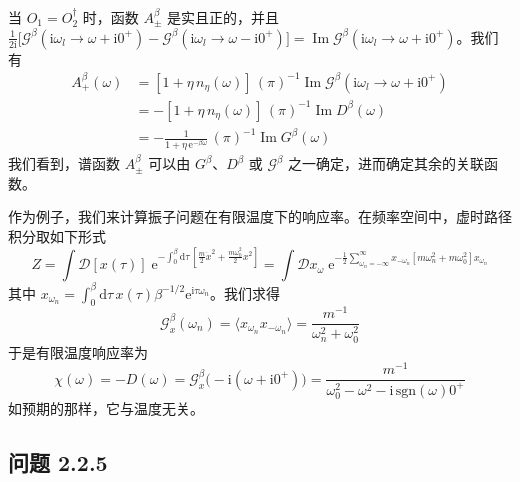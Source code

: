 当 $O_1 = O^{\dagger}_2$ 时，函数 $A^{\beta}_{\pm}$ 是实且正的，并且 $\frac{1}{2\mathrm{i}}\bigl[ \mathcal{G}^{\beta}(\mathrm{i}\omega_l \to \omega + \mathrm{i}0^{+}) - \mathcal{G}^{\beta}(\mathrm{i}\omega_l \to \omega - \mathrm{i}0^{+}) \bigr] = \operatorname{Im} \mathcal{G}^{\beta}(\mathrm{i}\omega_l \to \omega + \mathrm{i}0^{+})$。我们有
\begin{equation*}
\boxed{
\begin{aligned}
A^{\beta}_{+}(\omega) &= [1 + \eta\, n_{\eta}(\omega)]\,(\pi)^{-1} \operatorname{Im} \mathcal{G}^{\beta}(\mathrm{i}\omega_l \to \omega + \mathrm{i}0^{+})
\\
&= -[1 + \eta\, n_{\eta}(\omega)]\,(\pi)^{-1} \operatorname{Im} D^{\beta}(\omega)
\\
&= -\frac{1}{1 + \eta\,\mathrm{e}^{-\beta\omega}}\,(\pi)^{-1} \operatorname{Im} G^{\beta}(\omega)
\end{aligned}
} \tag{2.2.42}
\end{equation*}
我们看到，谱函数 $A^{\beta}_{\pm}$ 可以由 $G^{\beta}$、$D^{\beta}$ 或 $\mathcal{G}^{\beta}$ 之一确定，进而确定其余的关联函数。

作为例子，我们来计算振子问题在有限温度下的响应率。在频率空间中，虚时路径积分取如下形式
\begin{equation*}
Z = \int \mathcal{D}[x(\tau)]\; \mathrm{e}^{-\int_0^{\beta} \mathrm{d}\tau\, [\frac{m}{2}\dot{x}^2 + \frac{m\omega_0^2}{2} x^2]} = \int \mathcal{D}x_{\omega}\; \mathrm{e}^{-\frac{1}{2} \sum_{\omega_n = -\infty}^{\infty} x_{-\omega_n}\left[ m\omega_n^2 + m\omega_0^2 \right] x_{\omega_n}}
\end{equation*}
其中 $x_{\omega_n} = \int_0^{\beta} \mathrm{d}\tau\, x(\tau)\beta^{-1/2}\mathrm{e}^{\mathrm{i}\tau\omega_n}$。我们求得
\begin{equation*}
\mathcal{G}^{\beta}_{x}(\omega_n) = \langle x_{\omega_n} x_{-\omega_n} \rangle = \frac{m^{-1}}{\omega_n^2 + \omega_0^2} \tag{2.2.43}
\end{equation*}
于是有限温度响应率为
\begin{equation*}
\chi(\omega) = -D(\omega) = \mathcal{G}^{\beta}_{x}\bigl(-\mathrm{i}(\omega + \mathrm{i}0^{+})\bigr) = \frac{m^{-1}}{\omega_0^2 - \omega^2 - \mathrm{i}\,\mathrm{sgn}(\omega)0^{+}}
\end{equation*}
如预期的那样，它与温度无关。

\subsection*{问题 2.2.5}

